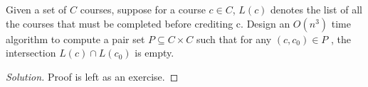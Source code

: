 \begin{solution}{2.3}
    \begin{question}
        Given a set of $C$ courses, suppose for a course $c \in C$, $L(c)$ denotes the list of all the courses that must be completed before crediting c. Design an $O(n^3)$ time algorithm to compute a pair set $P \subseteq C \times C$ such that for any $(c, c_0 ) \in P$ , the intersection $L(c) \cap L(c_0 )$ is empty.
    \end{question}
    \tcblower{}
    \begin{proof}[Solution]
        Proof is left as an exercise.
    \end{proof}
\end{solution}
